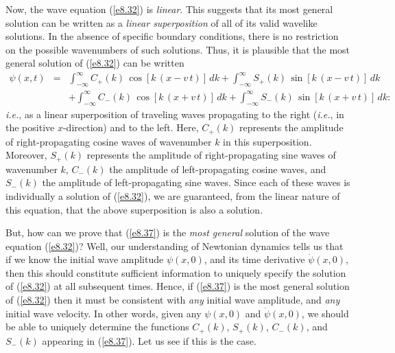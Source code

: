 Now, the wave equation (\ref{e8.32}) is {\em linear}. This suggests that its most
general solution can be written as a {\em linear superposition}\/ of all of its valid
wavelike solutions. In the absence of specific boundary
conditions, there is no restriction on the possible wavenumbers of such solutions.
Thus, it is plausible that the most general solution of (\ref{e8.32}) can be written
\begin{eqnarray}
\psi(x,t) &=& \int_{-\infty}^{\infty} C_+(k)\,\cos[k\,(x-v\,t)]\,dk+ \int_{-\infty}^{\infty} S_+(k)\,\sin[k\,(x-v\,t)]\,dk
\nonumber\\[0.5ex]
&&+ \int_{-\infty}^{\infty} C_-(k)\,\cos[k\,(x+v\,t)]\,dk+ \int_{-\infty}^{\infty} S_-(k)\,\sin[k\,(x+v\,t)]\,dk:\label{e8.37}
\end{eqnarray}
{\em i.e.}, as a linear superposition of traveling waves propagating to the
right ({\em i.e.}, in the positive $x$-direction) and to the left. Here, $C_+(k)$
represents the amplitude of right-propagating cosine waves of wavenumber $k$ in this
superposition. Moreover, $S_+(k)$ represents the amplitude of right-propagating sine waves of wavenumber $k$, $C_-(k)$ the amplitude of left-propagating cosine waves,
and $S_-(k)$ the amplitude of left-propagating sine waves. Since each of these
waves is individually a solution of (\ref{e8.32}), we are guaranteed, from the
linear nature of this equation, that the above superposition is also a solution.

But, how can we prove that (\ref{e8.37}) is the {\em most general}\/ solution of the
wave equation (\ref{e8.32})? Well, our understanding of Newtonian dynamics
tells us that if we know the initial wave amplitude $\psi(x,0)$, and its
time derivative $\dot{\psi}(x,0)$, then this should constitute  sufficient information to uniqu\-ely
specify the solution of (\ref{e8.32}) at all subsequent times. Hence, if
(\ref{e8.37}) is the most general solution of (\ref{e8.32}) then it must 
be consistent with {\em any}\/ initial wave amplitude, and {\em any}\/ initial wave velocity. In
other words, given any $\psi(x,0)$ and $\dot{\psi}(x,0)$, we should be
able to uniquely determine the functions $C_+(k)$, $S_+(k)$, $C_-(k)$, and
$S_-(k)$ appearing in (\ref{e8.37}). Let us see if this is the case.

